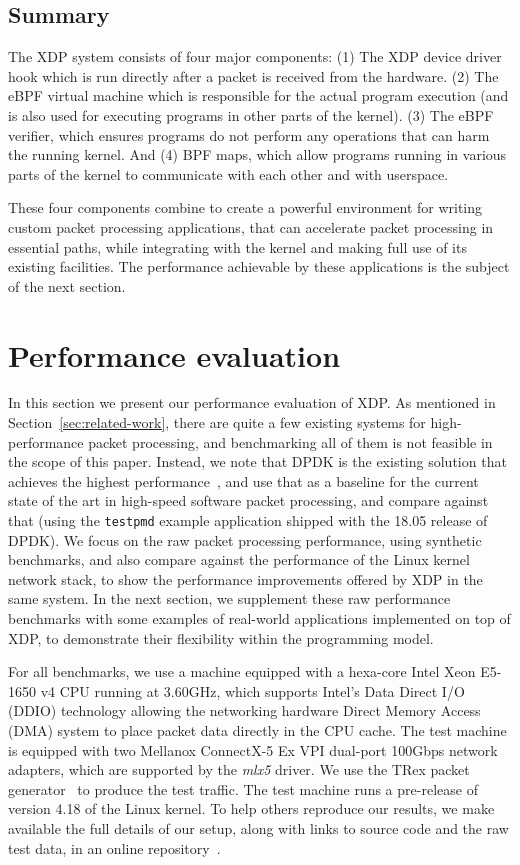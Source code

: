 \documentclass[sigconf]{acmart}
\begin{document}
\subsection{Summary}
\label{sec:design-summary}

The XDP system consists of four major components: (1) The XDP device driver hook
which is run directly after a packet is received from the hardware. (2) The eBPF
virtual machine which is responsible for the actual program execution (and is
also used for executing programs in other parts of the kernel). (3) The eBPF
verifier, which ensures programs do not perform any operations that can harm the
running kernel. And (4) BPF maps, which allow programs running in various parts
of the kernel to communicate with each other and with userspace.

These four components combine to create a powerful environment for writing
custom packet processing applications, that can accelerate packet processing in
essential paths, while integrating with the kernel and making full use of its
existing facilities. The performance achievable by these applications is the
subject of the next section.

\section{Performance evaluation}
\label{sec:perf-eval}
In this section we present our performance evaluation of XDP. As mentioned in
Section~\ref{sec:related-work}, there are quite a few existing systems for
high-performance packet processing, and benchmarking all of them is not feasible
in the scope of this paper. Instead, we note that DPDK is the existing solution
that achieves the highest performance~\cite{gallenmuller_comparison_2015}, and
use that as a baseline for the current state of the art in high-speed software
packet processing, and compare against that (using the \texttt{testpmd} example
application shipped with the 18.05 release of DPDK). We focus on the raw packet
processing performance, using synthetic benchmarks, and also compare against the
performance of the Linux kernel network stack, to show the performance
improvements offered by XDP in the same system. In the next section, we
supplement these raw performance benchmarks with some examples of real-world
applications implemented on top of XDP, to demonstrate their flexibility within
the programming model.

For all benchmarks, we use a machine equipped with a hexa-core Intel Xeon
E5-1650 v4 CPU running at 3.60GHz, which supports Intel's Data Direct I/O (DDIO)
technology allowing the networking hardware Direct Memory Access (DMA) system to
place packet data directly in the CPU cache. The test machine is equipped with
two Mellanox ConnectX-5 Ex VPI dual-port 100Gbps network adapters, which are
supported by the \emph{mlx5} driver. We use the TRex packet
generator~\cite{cisco18:_trex_traff_gener} to produce the test traffic. The test
machine runs a pre-release of version 4.18 of the Linux kernel. To help others
reproduce our results, we make available the full details of our setup, along
with links to source code and the raw test data, in an online
repository~\cite{test-data}.
\end{document}
